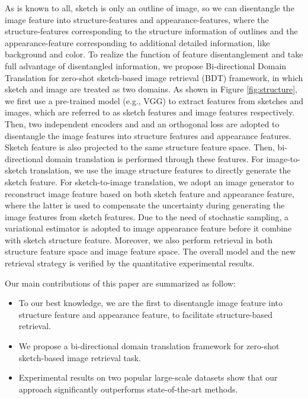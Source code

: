 \documentclass[10pt,twocolumn,letterpaper]{article}
\begin{document}
As is known to all, sketch is only an outline of image, so we can disentangle the image feature into structure-features and appearance-features, where the structure-features corresponding to the structure information of outlines and the appearance-feature corresponding to additional detailed information, like background and color. 
To realize the function of feature disentanglement and take full advantage of disentangled information, we propose Bi-directional Domain Translation for zero-shot sketch-based image retrieval (BDT) framework, in which sketch and image are treated as two domains. 
As shown in Figure \ref{fig:structure}, we first use a pre-trained model (e.g., VGG) to extract features from sketches and images, which are referred to as sketch features and image features respectively. 
Then, two independent encoders and and an orthogonal loss are adopted to disentangle the image features into structure features and appearance features.
Sketch feature is also projected to the same structure feature space. 
Then, bi-directional domain translation is performed through these features.
For image-to-sketch translation, we use the image structure features to directly generate the sketch feature. 
For sketch-to-image translation, we adopt an image generator to reconstruct image feature based on both sketch feature and appearance feature, where the latter is used to compensate the uncertainty during generating the image features from sketch features.
Due to the need of stochastic sampling, a variational estimator is adopted to image appearance feature before it combine with sketch structure feature. 
Moreover, we also perform retrieval in both structure feature space and image feature space. 
The overall model and the new retrieval strategy is verified by the quantitative experimental results. 

Our main contributions of this paper are summarized as follow:
\begin{itemize}
	\item To our best knowledge, we are the first to disentangle image feature into structure feature and appearance feature, to facilitate structure-based retrieval.
	\item We propose a bi-directional domain translation framework for zero-shot sketch-based image retrieval task.
	\item Experimental results on two popular large-scale datasets show that our approach significantly outperforms state-of-the-art methods.
\end{itemize}
\end{document}
